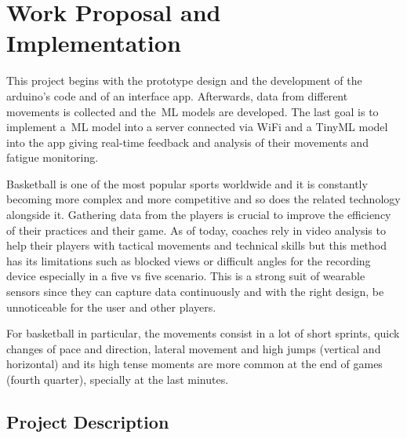 



\chapter{Work Proposal and Implementation}
\label{cha:workProposalAndImplementation}

This project begins with the prototype design and the development of the arduino's code and of an interface app. Afterwards, data from different movements is collected and the~\gls{ML} 
models are developed. The last goal is to implement a~\gls{ML} model into a server connected via WiFi and a Tiny\gls{ML} model into the app giving real-time feedback and analysis of their movements and fatigue 
monitoring.

Basketball is one of the most popular sports worldwide and it is constantly becoming more complex and more competitive and so does the related technology alongside it. Gathering data from the players is crucial 
to improve the efficiency of their practices and their game. As of today, coaches rely in video analysis to help their players with tactical movements and technical skills but this method has its 
limitations such as blocked views or difficult angles for the recording device especially in a five vs five scenario. This is a strong suit of wearable sensors since they can capture data
continuously and with the right design, be unnoticeable for the user and other players.

For basketball in particular, the movements consist in a lot of short sprints, quick changes of pace and direction, lateral movement and high jumps (vertical and horizontal) and its high tense moments are more common 
at the end of games (fourth quarter), specially at the last minutes.


\section{Project Description}
\label{sec:project_description}

